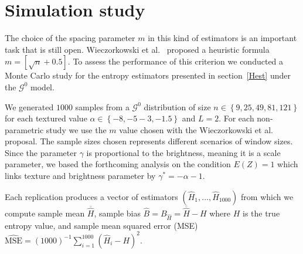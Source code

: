 \documentclass[journal]{IEEEtran}
\begin{document}
\section{Simulation study}\label{sec:simulation}

The choice of the spacing parameter $m$ in this kind of estimators is an important task that is still open. Wieczorkowski et al.~\cite{Wieczorkowski1999} proposed a heuristic formula $m=[\sqrt{n}+0.5]$. To assess the performance of this criterion we conducted a Monte Carlo study for the entropy estimators presented in section~\ref{Hest} under the $\mathcal{G}^0$ model.

We generated $1000$ samples from a $\mathcal{G}^0$ distribution of size $n \in\left\lbrace 9,25,49,81,121\right\rbrace $ for each textured value $\alpha \in\left\lbrace -8,-5-3,-1.5\right\rbrace $ and $L=2$. For each non-parametric study we use the $m$ value chosen with the Wieczorkowski et al. proposal.
The sample sizes chosen represents different scenarios of window sizes. Since the parameter $\gamma$ is proportional to the brightness, meaning it is a scale parameter, we based the forthcoming analysis on the condition $E(Z)=1$ which links texture and brightness parameter by $\gamma^* =-\alpha-1$. 

Each replication produces a vector  of estimators $(\widehat{H}_1, \dots, \widehat{H}_{1000})$ from which we compute sample mean $\overline{\widehat{H}}$, 
sample bias $\widehat{B}=B_{\widehat{H}} = \overline{\widehat{H}}- H$ where $H$ is the true entropy value, and sample mean squared error (MSE) $\widehat{\textrm{MSE}}=({1000})^{-1}{\sum_{i=1}^{1000}{(\widehat{H}_i-H)^2}}$.
\end{document}
